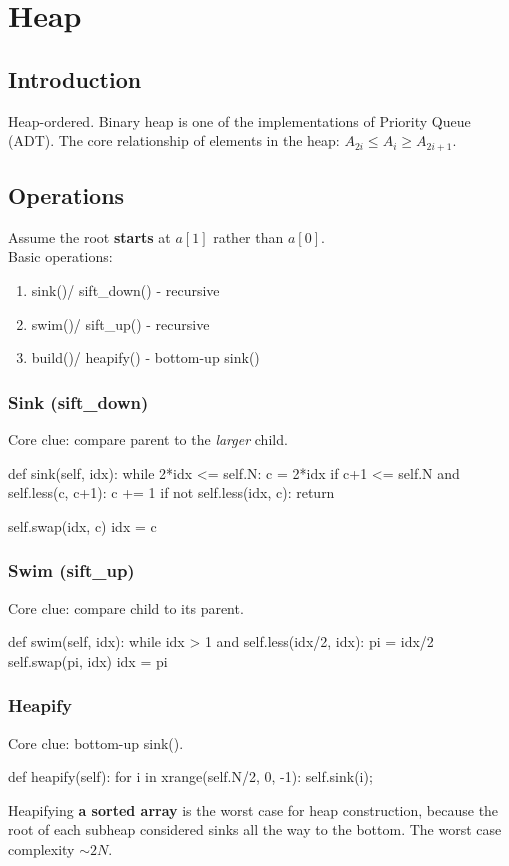 \chapter{Heap}

\section{Introduction}
Heap-ordered. Binary heap is one of the implementations of Priority Queue (ADT). The core relationship of elements in the heap:
$A_{2i} \leq A_{i} \geq A_{2i+1}$.

\section{Operations}
Assume the root \textbf{starts} at $a[1]$ rather than $a[0]$.
\\
Basic operations:
\begin{enumerate}
\item sink()/ sift\_down() - recursive
\item swim()/ sift\_up() - recursive
\item build()/ heapify() - bottom-up sink()
\end{enumerate}
\subsection{Sink (sift\_down)}
Core clue: compare parent to the \textit{larger} child. 
\begin{python}
def sink(self, idx):
    while 2*idx <= self.N:
        c = 2*idx
        if c+1 <= self.N and self.less(c, c+1):
            c += 1
        if not self.less(idx, c):
            return 

        self.swap(idx, c)
        idx = c
\end{python}

\subsection{Swim (sift\_up)}
Core clue: compare child to its parent. 
\begin{python}
def swim(self, idx):
    while idx > 1 and self.less(idx/2, idx):
        pi = idx/2
        self.swap(pi, idx)
        idx = pi
\end{python}
\subsection{Heapify}
Core clue: bottom-up sink().
\begin{python}
def heapify(self):
    for i in xrange(self.N/2, 0, -1):
        self.sink(i);
\end{python}
 Heapifying \textbf{a sorted array} is the worst case for heap construction, because the root of each subheap considered sinks all the way to the bottom. The worst case complexity $\sim 2N$. 

